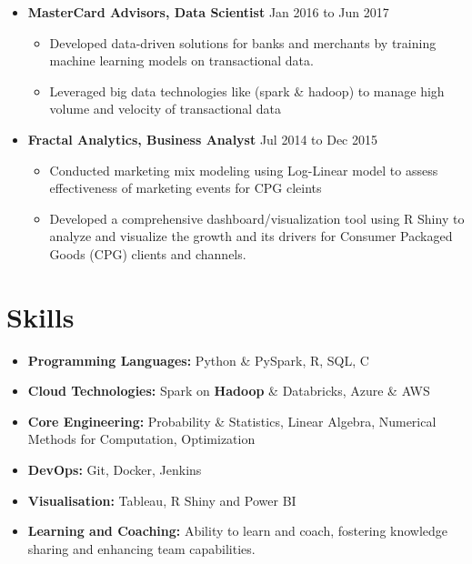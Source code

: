 \documentclass[a4paper,10pt]{article}
\begin{document}
\begin{itemize}[leftmargin=0.2cm, label={}]
    \item \textbf{MasterCard Advisors, Data Scientist} \hfill \textnormal{Jan 2016 to Jun 2017}
    \begin{itemize}[leftmargin=0.5cm, label={\textbullet}]
        \item Developed data-driven solutions for banks and merchants by training machine learning models on transactional data.
        \item Leveraged big data technologies like (spark \& hadoop) to manage high volume and velocity of transactional data
    \end{itemize}
    
    \item \textbf{Fractal Analytics, Business Analyst} \hfill \textnormal{Jul 2014 to Dec 2015}
    \begin{itemize}[leftmargin=0.5cm, label={\textbullet}]
        \item Conducted marketing mix modeling using Log-Linear model to assess effectiveness of marketing events for CPG cleints 
        \item Developed a comprehensive dashboard/visualization tool using R Shiny to analyze and visualize the growth and its drivers for Consumer Packaged Goods (CPG) clients
        and channels.
    \end{itemize}
\end{itemize}

\section*{Skills}
\begin{itemize}[leftmargin=0.2cm, label={}]
    \item \textbf{Programming Languages:} Python \& PySpark, R, SQL, C
    \item \textbf{Cloud Technologies:} Spark on {\textbf{Hadoop}} \& Databricks, Azure \& AWS 
    \item \textbf{Core Engineering:} Probability \& Statistics, Linear Algebra, Numerical Methods for Computation, Optimization
    \item \textbf{DevOps:} Git, Docker, Jenkins
    \item \textbf{Visualisation:} Tableau, R Shiny and Power BI
    \item \textbf{Learning and Coaching:} Ability to learn and coach, fostering knowledge sharing and enhancing team capabilities.
\end{itemize}
\end{document}
